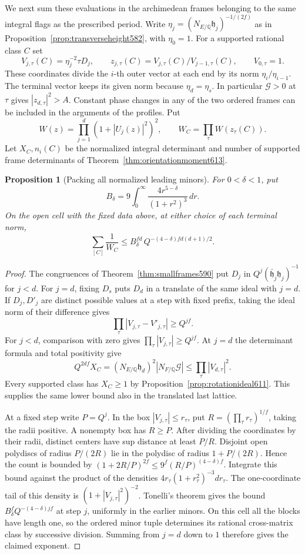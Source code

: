 \documentclass[a4paper,11pt]{article}
\newtheorem{proposition}{Proposition}[section]
\theoremstyle{definition}
\theoremstyle{remark}
\numberwithin{equation}{section}
\begin{document}
We next sum these evaluations in the archimedean frames belonging
to the same integral flags as the prescribed period. Write
\(\eta_j=(N_{E/\mathbb Q}\mathfrak h_j)^{-1/(2f)}\) as in
Proposition~\ref{prop:transverseheight582}, with \(\eta_0=1\).
For a supported rational class \(C\) set
\[
 V_{j,\tau}(C)=\eta_j^{-2}\tau D_j,\qquad
 z_{j,\tau}(C)=V_{j,\tau}(C)/V_{j-1,\tau}(C),\qquad V_{0,\tau}=1.
\]
These coordinates divide the \(i\)-th outer vector at each
end by its norm \(\eta_i/\eta_{i-1}\). The terminal vector keeps
its given norm because \(\eta_d=\eta_s\). In particular
\(\mathcal G>0\) at \(\tau\) gives
\(|z_{d,\tau}|^2>A\). Constant phase changes in any of the two
ordered frames can be included in the arguments of the
profiles. Put
\[
 W(z)=\prod_{j=1}^d(1+|U_j(z)|^2)^2,\qquad
 W_C=\prod_\tau W(z_\tau(C)).
\]
Let \(X_C,n_i(C)\) be the normalized integral determinant and
number of supported frame determinants of
Theorem~\ref{thm:orientationmoment613}.

\begin{proposition}[Packing all normalized leading minors]
\leavevmode\label{prop:openpacking615}
For \(0<\delta<1\), put
\[
 B_\delta=9\int_0^\infty\frac{4r^{5-\delta}}{(1+r^2)^3}\,dr .
\]
On the open cell with the fixed data above, at either choice of
each terminal norm,
\[
 \sum_{[C]}\frac1{W_C}
      \le B_\delta^{fd}\,Q^{-(4-\delta)fd(d+1)/2}.
\]
\end{proposition}
\begin{proof}
The congruences of Theorem~\ref{thm:smallframes590} put \(D_j\)
in \(Q^j(\bar{\mathfrak h}_j\mathfrak h_j)^{-1}\) for \(j<d\).
For \(j=d\), fixing \(D_s\) puts \(D_d\) in a translate of the
same ideal with \(j=d\). If \(D_j,D'_j\) are distinct possible
values at a step with fixed prefix, taking the ideal norm of
their difference gives
\[
  \prod_\tau|V_{j,\tau}-V'_{j,\tau}|\ge Q^{jf}.
\]
For \(j<d\), comparison with zero gives
\(\prod_\tau |V_{j,\tau}|\ge Q^{jf}\). At \(j=d\) the
determinant formula and total positivity give
\[
 Q^{2df} X_C=(N_{E/\mathbb Q}\mathfrak h_d)^2
                    |N_{F/\mathbb Q}\mathcal G|
       \le\prod_\tau |V_{d,\tau}|^2 .
\]
Every supported class has \(X_C\ge1\) by
Proposition~\ref{prop:rotationideal611}. This supplies the same
lower bound also in the translated last lattice.

At a fixed step write \(P=Q^j\). In the box
\(|V_{j,\tau}|\le r_\tau\), put
\(R=(\prod_\tau r_\tau)^{1/f}\), taking the radii positive.
A nonempty box has \(R\ge P\). After dividing the coordinates by
their radii, distinct centers have sup distance at least \(P/R\).
Disjoint open polydiscs of radius \(P/(2R)\) lie in the
polydisc of radius \(1+P/(2R)\). Hence the count is bounded by
\((1+2R/P)^{2f}\le9^f(R/P)^{(4-\delta)f}\).
Integrate this bound against the product of the densities
\(4r_\tau(1+r_\tau^2)^{-3}dr_\tau\). The one-coordinate tail
of this density is \((1+|V_{j,\tau}|^2)^{-2}\).
Tonelli's theorem gives the bound \(B_\delta^f Q^{-(4-\delta)jf}\)
at step \(j\), uniformly in the earlier minors.
On this cell all the blocks have length one, so the ordered
minor tuple determines its rational cross-matrix class by
successive division. Summing from \(j=d\) down to \(1\)
therefore gives the claimed exponent.
\end{proof}
\end{document}
